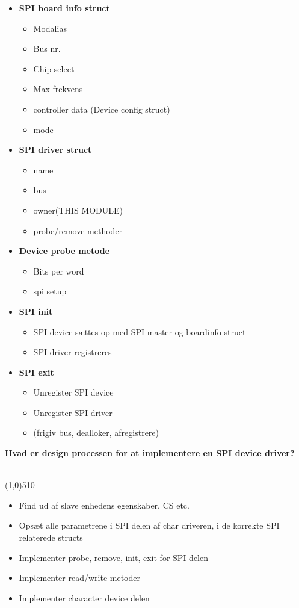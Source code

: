 \documentclass{paper}
\begin{document}
\begin{itemize}
	\item \textbf{SPI board info struct}
	\begin{itemize}
		\item Modalias 
		\item Bus nr.
		\item Chip select
		\item Max frekvens
		\item controller data (Device config struct)
		\item mode 
	\end{itemize}
	\item \textbf{SPI driver struct}
	\begin{itemize}
		\item name
		\item bus
		\item owner(THIS MODULE)
		\item probe/remove methoder
	\end{itemize}
	\item \textbf{Device probe metode}
	\begin{itemize}
		\item Bits per word
		\item spi setup
	\end{itemize}
	\item \textbf{SPI init}
	\begin{itemize}
		\item SPI device s\ae ttes op med SPI master og boardinfo struct
		\item SPI driver registreres
	\end{itemize}
	\item \textbf{SPI exit}
	\begin{itemize}
		\item Unregister SPI device
		\item Unregister SPI driver\\
		\item (frigiv bus, dealloker, afregistrere)
	\end{itemize}
\end{itemize}
\begin{large}\textbf{Hvad er design processen for at implementere en SPI device driver?}\end{large}\\
\line(1,0){510}
\begin{itemize}
	\item Find ud af slave enhedens egenskaber, CS etc.
	\item Ops\ae t alle parametrene i SPI delen af char driveren, i de korrekte SPI relaterede structs
	\item Implementer probe, remove, init, exit for SPI delen
	\item Implementer read/write metoder
	\item Implementer character device delen
\end{itemize}
\end{document}
